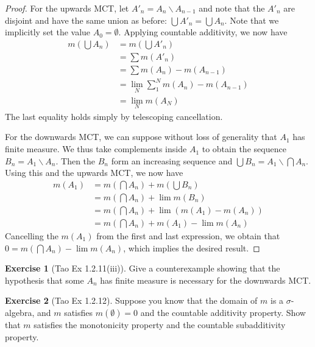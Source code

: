 \documentclass[11pt,oneside]{amsbook}
\renewcommand{\setminus}{\smallsetminus}
\theoremstyle{definition}
\newtheorem{exerc}{Exercise}[section]
\theoremstyle{plain}
\theoremstyle{definition}
\theoremstyle{remark}
\numberwithin{equation}{section}
\numberwithin{figure}{section}
\begin{document}
\begin{proof}
  For the upwards MCT, let $A'_n=A_n\setminus A_{n-1}$ and note that the $A'_n$ are disjoint and have the same union as before: $\bigcup A'_n=\bigcup A_n$. Note that we implicitly set the value $A_0=\emptyset$. Applying countable additivity, we now have
  \begin{align*}
    m(\bigcup A_n)&=m(\bigcup A'_n)\\
                  &=\sum m(A'_n)\\
                  &=\sum m(A_n)-m(A_{n-1})\\
                  &=\lim_N \sum_1^N m(A_n)-m(A_{n-1})\\
                  &=\lim_N m(A_N)
  \end{align*}
  The last equality holds simply by telescoping cancellation.

  For the downwards MCT, we can suppose without loss of generality that $A_1$ has finite measure. We thus take complements inside $A_1$ to obtain the sequence $B_n=A_1\setminus A_n$. Then the $B_n$ form an increasing sequence and $\bigcup B_n=A_1\setminus\bigcap A_n$. Using this and the upwards MCT, we now have
  \begin{align*}
    m(A_1)&=m(\bigcap A_n)+m(\bigcup B_n)\\
          &=m(\bigcap A_n)+\lim m(B_n)\\
          &=m(\bigcap A_n)+\lim (m(A_1)-m(A_n))\\
          &=m(\bigcap A_n)+m(A_1)-\lim m(A_n)
  \end{align*}
  Cancelling the $m(A_1)$ from the first and last expression, we obtain that $0=m(\bigcap A_n)-\lim m(A_n)$, which implies the desired result.
\end{proof}

\begin{exerc}[Tao Ex 1.2.11(iii)]
  Give a counterexample showing that the hypothesis that some $A_n$ has finite measure is necessary for the downwards MCT.
\end{exerc}

\begin{exerc}[Tao Ex 1.2.12]
  Suppose you know that the domain of $m$ is a $\sigma$-algebra, and $m$ satisfies $m(\emptyset)=0$ and the countable additivity property. Show that $m$ satisfies the monotonicity property and the countable subadditivity property.
\end{exerc}
\end{document}
